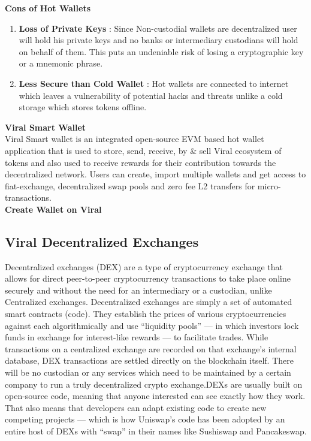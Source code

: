 \documentclass[10pt]{article}
\begin{document}
\textbf{Cons of Hot Wallets}
\begin{enumerate}[leftmargin=+0.2in]
\item \textbf{Loss of Private Keys} : Since Non-custodial wallets are decentralized user will hold his private keys and no banks or intermediary custodians will hold on behalf of them. This puts an undeniable risk of losing a cryptographic key or a mnemonic phrase.
\item \textbf{Less Secure than Cold Wallet} : Hot wallets are connected to internet which leaves a vulnerability of potential hacks and threats unlike a cold storage which stores tokens offline.
\end{enumerate}


\textbf{Viral Smart Wallet}\\

Viral Smart wallet is an integrated open-source EVM based hot wallet application that is used to store, send, receive, by \& sell Viral ecosystem of tokens and also used to receive rewards for their contribution towards the decentralized network. Users can create, import multiple wallets and get access to fiat-exchange, decentralized swap pools and zero fee L2 transfers for micro-transactions. \\

\textbf{Create Wallet on Viral}\\



\newpage

\subsection{Viral Decentralized Exchanges}

Decentralized exchanges (DEX) are a type of cryptocurrency exchange that allows for direct peer-to-peer cryptocurrency transactions to take place online securely and without the need for an intermediary or a custodian, unlike Centralized exchanges. Decentralized exchanges are simply a set of automated smart contracts (code). They establish the prices of various cryptocurrencies against each algorithmically and use “liquidity pools” — in which investors lock funds in exchange for interest-like rewards — to facilitate trades. While transactions on a centralized exchange are recorded on that exchange’s internal database, DEX transactions are settled directly on the blockchain itself. There will be no custodian or any services which need to be maintained by a certain company to run a truly decentralized crypto exchange.DEXs are usually built on open-source code, meaning that anyone interested can see exactly how they work. That also means that developers can adapt existing code to create new competing projects — which is how Uniswap’s code has been adopted by an entire host of DEXs with “swap” in their names like Sushiswap and Pancakeswap.\\
\end{document}
